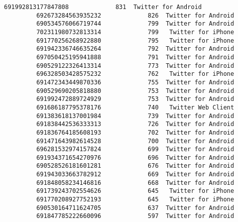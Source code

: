 \documentclass[11pt]{article}
\begin{document}
\begin{Verbatim}[commandchars=\\\{\}]
         691992813177847808             831  Twitter for Android   
         692673284563935232             826  Twitter for Android   
         690534576066719744             799  Twitter for Android   
         702311980732813314             799   Twitter for iPhone   
         691770256268922880             795   Twitter for iPhone   
         691942336746635264             792  Twitter for Android   
         697050425195941888             791  Twitter for Android   
         690529122326413314             773  Twitter for Android   
         696328503428575232             762   Twitter for iPhone   
         691472343449870336             755  Twitter for Android   
         690529690205818880             753  Twitter for Android   
         691992472889724929             753  Twitter for Android   
         691686187795378176             740   Twitter Web Client   
         691383618137001984             739  Twitter for Android   
         691838442536333313             726  Twitter for Android   
         691836764185608193             702  Twitter for Android   
         691471643982614528             700  Twitter for Android   
         696281532974157824             699  Twitter for Android   
         691934371654270976             696  Twitter for Android   
         690528526181601281             676  Twitter for Android   
         691943033663782912             669  Twitter for Android   
         691848058234146816             668  Twitter for Android   
         691739243702554626             645   Twitter for iPhone   
         691770208927752193             645   Twitter for iPhone   
         690530164711624705             637  Twitter for Android   
         691847785222660096             597  Twitter for Android   
         

\end{Verbatim}
\end{document}

